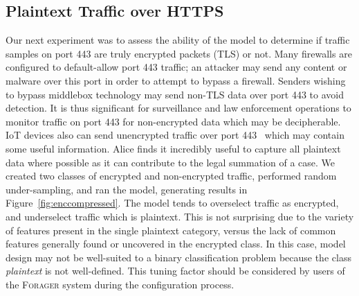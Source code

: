 \subsection{Plaintext Traffic over HTTPS}
Our next experiment was to assess the ability of the model to determine if traffic samples on port 443 are truly encrypted packets (TLS) or not. Many firewalls are configured to default-allow port 443 traffic; an attacker may send any content or malware over this port in order to attempt to bypass a firewall. Senders wishing to bypass middlebox technology may send non-TLS data over port 443 to avoid detection. It is thus significant for surveillance and law enforcement operations to monitor traffic on port 443 for non-encrypted data which may be decipherable. IoT devices also can send unencrypted traffic over port 443~\cite{wood2017cleartext} which may contain some useful information. Alice finds it incredibly useful to capture all plaintext data where possible as it can contribute to the legal summation of a case. We created two classes of encrypted and non-encrypted traffic, performed random under-sampling, and ran the model, generating results in Figure~\ref{fig:enccompressed}. The model tends to overselect traffic as encrypted, and underselect traffic which is plaintext. This is not surprising due to the variety of features present in the single plaintext category, versus the lack of common features generally found or uncovered in the encrypted class. In this case, model design may not be well-suited to a binary classification problem because the class \textit{plaintext} is not well-defined. This tuning factor should be considered by users of the \textsc{Forager} system during the configuration process.

